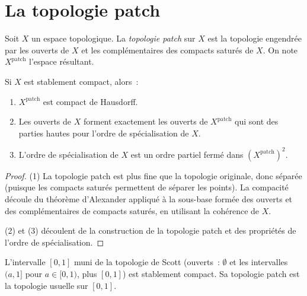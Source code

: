 \section{La topologie patch}

\begin{definition}
Soit $X$ un espace topologique. La \emph{topologie patch} sur $X$ est la topologie
engendr\'ee par les ouverts de $X$ et les compl\'ementaires des compacts satur\'es de $X$.
On note $X^{\mathrm{patch}}$ l'espace r\'esultant.
\end{definition}

\begin{theoreme}
\label{thm:patch}
Si $X$ est stablement compact, alors~:
\begin{enumerate}
  \item $X^{\mathrm{patch}}$ est compact de Hausdorff.
  \item Les ouverts de $X$ forment exactement les ouverts de $X^{\mathrm{patch}}$
    qui sont des parties hautes pour l'ordre de sp\'ecialisation de $X$.
  \item L'ordre de sp\'ecialisation de $X$ est un ordre partiel ferm\'e dans
    $(X^{\mathrm{patch}})^2$.
\end{enumerate}
\end{theoreme}

\begin{proof}
(1) La topologie patch est plus fine que la topologie originale, donc s\'epar\'ee
(puisque les compacts satur\'es permettent de s\'eparer les points). La compacit\'e
d\'ecoule du th\'eor\`eme d'Alexander appliqu\'e \`a la sous-base form\'ee des ouverts
et des compl\'ementaires de compacts satur\'es, en utilisant la coh\'erence de $X$.

(2) et (3) d\'ecoulent de la construction de la topologie patch et des propri\'et\'es de
l'ordre de sp\'ecialisation.
\end{proof}

\begin{exemple}
L'intervalle $[0,1]$ muni de la topologie de Scott (ouverts~: $\emptyset$ et les
intervalles $(a, 1]$ pour $a \in [0,1)$, plus $[0,1]$) est stablement compact.
Sa topologie patch est la topologie usuelle sur $[0,1]$.
\end{exemple}

